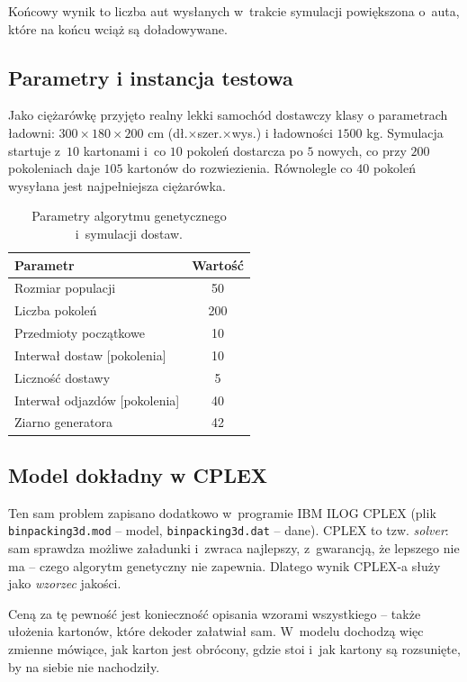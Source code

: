\documentclass[12pt]{article}
\begin{document}
 Końcowy wynik to liczba aut wysłanych w~trakcie symulacji powiększona o~auta, które na końcu wciąż są doładowywane.

\subsection{Parametry i instancja testowa}

Jako ciężarówkę przyjęto realny lekki samochód dostawczy klasy o parametrach ładowni: $300\times180\times200$ cm (dł.$\times$szer.$\times$wys.) i ładowności $1500$ kg.
Symulacja startuje z~$10$ kartonami i~co $10$ pokoleń dostarcza po $5$ nowych, co przy $200$ pokoleniach daje $105$ kartonów do rozwiezienia. Równolegle co $40$ pokoleń wysyłana jest najpełniejsza ciężarówka.

\begin{table}[H]
\centering
\begin{tabular}{lc}
\toprule
Parametr & Wartość \\
\midrule
Rozmiar populacji & 50 \\
Liczba pokoleń & 200 \\
Przedmioty początkowe & 10 \\
Interwał dostaw [pokolenia] & 10 \\
Liczność dostawy & 5 \\
Interwał odjazdów [pokolenia] & 40 \\
Ziarno generatora & 42 \\
\bottomrule
\end{tabular}
\caption{Parametry algorytmu genetycznego i~symulacji dostaw.}
\end{table}

\subsection{Model dokładny w CPLEX}

Ten sam problem zapisano dodatkowo w~programie IBM ILOG CPLEX (plik \texttt{binpacking3d.mod} -- model, \texttt{binpacking3d.dat} -- dane). CPLEX to tzw. \textit{solver}: sam sprawdza możliwe załadunki i~zwraca najlepszy, z~gwarancją, że lepszego nie ma -- czego algorytm genetyczny nie zapewnia. Dlatego wynik CPLEX-a służy jako \textit{wzorzec} jakości.

Ceną za tę pewność jest konieczność opisania wzorami wszystkiego -- także ułożenia kartonów, które dekoder załatwiał sam. W~modelu dochodzą więc zmienne mówiące, jak karton jest obrócony, gdzie stoi i~jak kartony są rozsunięte, by na siebie nie nachodziły.
\end{document}
